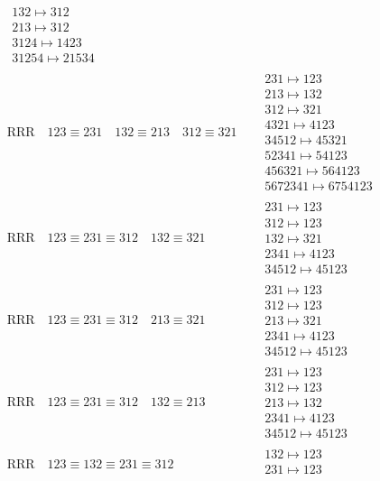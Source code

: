 \documentclass{article}
\begin{document}
\begin{align}
\begin{matrix}
132 \mapsto 312
\\
213 \mapsto 312
\\
3124 \mapsto 1423
\\
31254 \mapsto 21534
\end{matrix}
\\
\text{RRR}
\quad
123\equiv231
\quad
132\equiv213
\quad
312\equiv321
\quad
&
\begin{matrix}
231 \mapsto 123
\\
213 \mapsto 132
\\
312 \mapsto 321
\\
4321 \mapsto 4123
\\
34512 \mapsto 45321
\\
52341 \mapsto 54123
\\
456321 \mapsto 564123
\\
5672341 \mapsto 6754123
\end{matrix}
\\
\text{RRR}
\quad
123\equiv231\equiv312
\quad
132\equiv321
\quad
&
\begin{matrix}
231 \mapsto 123
\\
312 \mapsto 123
\\
132 \mapsto 321
\\
2341 \mapsto 4123
\\
34512 \mapsto 45123
\end{matrix}
\\
\text{RRR}
\quad
123\equiv231\equiv312
\quad
213\equiv321
\quad
&
\begin{matrix}
231 \mapsto 123
\\
312 \mapsto 123
\\
213 \mapsto 321
\\
2341 \mapsto 4123
\\
34512 \mapsto 45123
\end{matrix}
\\
\text{RRR}
\quad
123\equiv231\equiv312
\quad
132\equiv213
\quad
&
\begin{matrix}
231 \mapsto 123
\\
312 \mapsto 123
\\
213 \mapsto 132
\\
2341 \mapsto 4123
\\
34512 \mapsto 45123
\end{matrix}
\\
\text{RRR}
\quad
123\equiv132\equiv231\equiv312
\quad
&
\begin{matrix}
132 \mapsto 123
\\
231 \mapsto 123
\\

\end{matrix}
\end{align}
\end{document}
